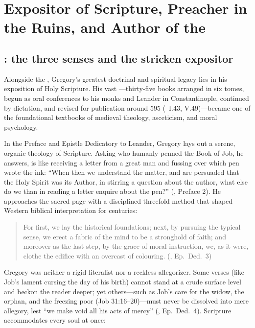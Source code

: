 \section{Expositor of Scripture, Preacher in the Ruins, and Author of the }

\subsection{: the three senses and the stricken expositor}

Alongside the , Gregory's greatest doctrinal and
spiritual legacy lies in his exposition of Holy Scripture. His vast
---thirty-five books arranged in six tomes, begun as oral
conferences to his monks and Leander in Constantinople, continued by dictation,
and revised for publication around 595 (\ I.43, V.49)---became one
of the foundational textbooks of medieval theology, asceticism, and moral
psychology.

In the Preface and Epistle Dedicatory to Leander, Gregory lays out a serene,
organic theology of Scripture. Asking who humanly penned the Book of Job, he
answers, is like receiving a letter from a great man and fussing over which
pen wrote the ink: ``When then we understand the matter, and are persuaded that
the Holy Spirit was its Author, in stirring a question about the author, what
else do we than in reading a letter enquire about the pen?'' (,
Preface 2). He approaches the sacred page with a disciplined threefold method
that shaped Western biblical interpretation for centuries:

\begin{quote}
For first, we lay the historical foundations; next, by pursuing the typical
sense, we erect a fabric of the mind to be a stronghold of faith; and moreover
as the last step, by the grace of moral instruction, we, as it were, clothe the
edifice with an overcast of colouring. (, Ep.\ Ded.\ 3)
\end{quote}

Gregory was neither a rigid literalist nor a reckless allegorizer. Some verses
(like Job's lament cursing the day of his birth) cannot stand at a crude
surface level and beckon the reader deeper; yet others---such as Job's care
for the widow, the orphan, and the freezing poor (Job 31:16--20)---must never
be dissolved into mere allegory, lest ``we make void all his acts of mercy''
(, Ep.\ Ded.\ 4). Scripture accommodates every soul at once:

